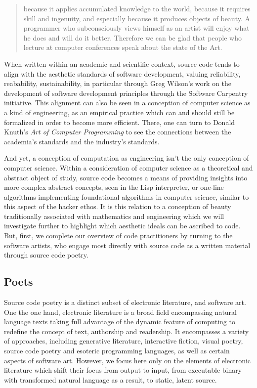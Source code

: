 \begin{quote}
  because it applies accumulated knowledge to the world, because it requires skill and ingenuity, and especially because it produces objects of beauty. A programmer who subconsciously views himself as an artist will enjoy what he does and will do it better. Therefore we can be glad that people who lecture at computer conferences speak about the state of the Art. \citep{knuth_computer_1974}
\end{quote}

When written within an academic and scientific context, source code tends to align with the aesthetic standards of software development, valuing reliability, reabability, sustainability, in particular through Greg Wilson's work on the development of software development principles through the Software Carpentry initiative. This alignment can also be seen in a conception of computer science as a kind of engineering, as an empirical practice which can and should still be formalized in order to become more efficient. There, one can turn to Donald Knuth's \emph{Art of Computer Programming} to see the connections between the academia's standards and the industry's standards.

And yet, a conception of computation as engineering isn't the only conception of computer science. Within a consideration of computer science as a  theoretical and abstract object of study, source code becomes a means of providing insights into more complex abstract concepts, seen in the Lisp interpreter, or one-line algorithms implementing foundational algorithms in computer science, similar to this aspect of the hacker ethos. It is this relation to a conception of beauty traditionally associated with mathematics and engineering which we will investigate further to highlight which aesthetic ideals can be ascribed to code. But, first, we complete our overview of code practitioners by turning to the software artists, who engage most directly with source code as a written material through source code poetry.

\pagebreak

\subsection{Poets}
\label{subsec:poets}

Source code poetry is a distinct subset of electronic literature, and software art. One the one hand, electronic literature is a broad field encompassing natural language texts taking full advantage of the dynamic feature of computing to redefine the concept of text, authorship and readership. It encompasses a variety of approaches, including generative literature, interactive fiction, visual poetry, source code poetry and esoteric programming languages, as well as certain aspects of software art. However, we focus here only on the elements of electronic literature which shift their focus from output to input, from executable binary with transformed natural language as a result, to static, latent source.

